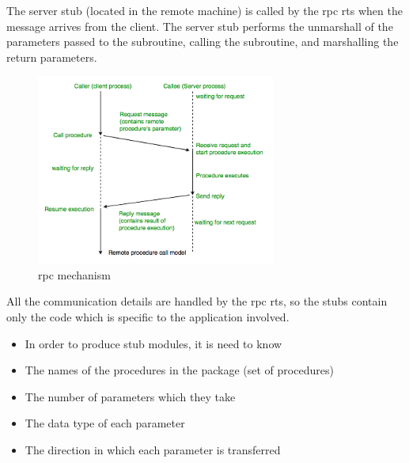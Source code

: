 The server stub (located in the remote machine) is called by the \acrshort{rpc} \acrshort{rts} when the message arrives from the client. The server stub performs the unmarshall of the parameters passed to the subroutine, calling the subroutine, and marshalling the return parameters.
\begin{figure}[h]
    \centering
    \includegraphics[width=0.7\textwidth]{images/State of the Art/json-rpc/rpc-mecha.png}
    \caption{\acrshort{rpc} mechanism}
    \label{fig:rpc_mechanism}
\end{figure}
All the communication details are handled by the \acrshort{rpc} \acrshort{rts}, so the stubs contain only the code which is specific to the application involved\cite{rpc2}.
\begin{itemize}
    \item In order to produce stub modules, it is need to know
    \item The names of the procedures in the package (set of procedures)
    \item The number of parameters which they take
    \item The data type of each parameter
    \item The direction in which each parameter is transferred
\end{itemize}
